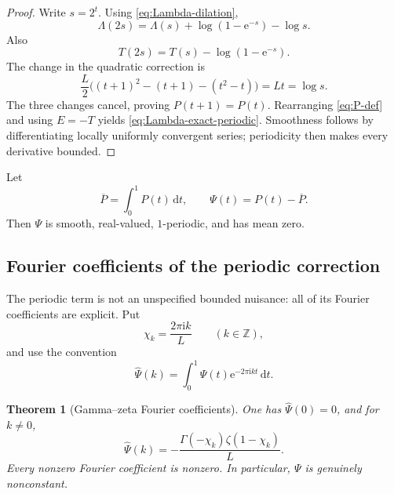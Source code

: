 \documentclass[11pt,oneside]{article}
\newtheorem{theorem}{Theorem}[section]
\theoremstyle{definition}
\theoremstyle{remark}
\newcommand{\Z}{\mathbb Z}
\newcommand{\e}{\mathrm e}
\newcommand{\ii}{\mathrm i}
\newcommand{\dd}{\,\mathrm d}
\begin{document}
\begin{proof}
Write $s=2^t$.  Using \eqref{eq:Lambda-dilation},
\begin{equation*}
 \Lambda(2s)=\Lambda(s)+\log(1-\e^{-s})-\log s.
\end{equation*}
Also
\begin{equation*}
 T(2s)=T(s)-\log(1-\e^{-s}).
\end{equation*}
The change in the quadratic correction is
\begin{equation*}
 \frac L2\bigl((t+1)^2-(t+1)-(t^2-t)\bigr)=Lt=\log s.
\end{equation*}
The three changes cancel, proving $P(t+1)=P(t)$.  Rearranging
\eqref{eq:P-def} and using $E=-T$ yields \eqref{eq:Lambda-exact-periodic}.
Smoothness follows by differentiating locally uniformly convergent series; periodicity then
makes every derivative bounded.
\end{proof}

Let
\begin{equation}
 \overline P=\int_0^1P(t)\dd t,
 \qquad \Psi(t)=P(t)-\overline P.                          \label{eq:Psi-def}
\end{equation}
Then $\Psi$ is smooth, real-valued, $1$-periodic, and has mean zero.

\subsection{Fourier coefficients of the periodic correction}

The periodic term is not an unspecified bounded nuisance: all of its Fourier coefficients
are explicit.  Put
\begin{equation}
 \chi_k=\frac{2\pi\ii k}{L}\qquad(k\in\Z),                 \label{eq:chi-k}
\end{equation}
and use the convention
\begin{equation}
 \widehat\Psi(k)=\int_0^1\Psi(t)\e^{-2\pi\ii kt}\dd t.    \label{eq:Psi-Fourier-def}
\end{equation}

\begin{theorem}[Gamma--zeta Fourier coefficients]
One has $\widehat\Psi(0)=0$, and for $k\ne0$,
\begin{equation}
 \boxed{
 \widehat\Psi(k)=
 -\frac{\Gamma(-\chi_k)\zeta(1-\chi_k)}{L}.}              \label{eq:Psi-Fourier}
\end{equation}
Every nonzero Fourier coefficient is nonzero.  In particular, $\Psi$ is genuinely
nonconstant.
\end{theorem}
\end{document}
